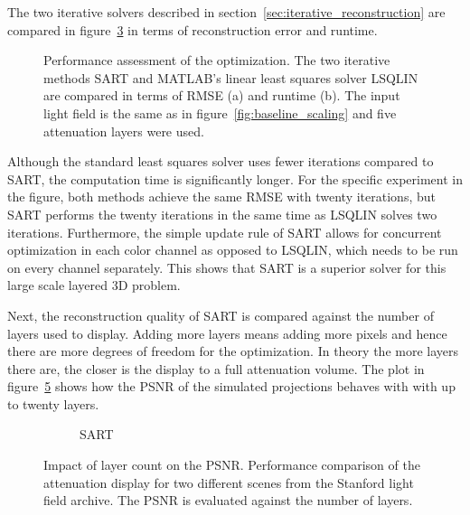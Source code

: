 The two iterative solvers described in section~\ref{sec:iterative_reconstruction} are compared in figure~\ref{fig:sart_vs_lsqlin} in terms of reconstruction error and runtime.
\begin{figure}[tb]
	\begin{subfigure}{0.5\textwidth}
		\centering
		
		\caption{}
		\label{fig:sart_lsqlin_iterations_vs_rmse}
	\end{subfigure}%
	\begin{subfigure}{0.5\textwidth}
		\centering
		
		\caption{}
		\label{fig:sart_lsqlin_iterations_vs_time}
	\end{subfigure}%
	\caption[Performance assessment of the optimization]
			{Performance assessment of the optimization.
			 The two iterative methods \mbox{SART} and \mbox{MATLAB's} linear least squares solver LSQLIN are compared in terms of \mbox{RMSE} (a) and runtime (b).
			 The input light field is the same as in figure~\ref{fig:baseline_scaling} and five attenuation layers were used.}
	\label{fig:sart_vs_lsqlin}
\end{figure}
Although the standard least squares solver uses fewer iterations compared to SART, the computation time is significantly longer.
For the specific experiment in the figure, both methods achieve the same RMSE with twenty iterations, but SART performs the twenty iterations in the same time as LSQLIN solves two iterations.
Furthermore, the simple update rule of SART allows for concurrent optimization in each color channel as opposed to LSQLIN, which needs to be run on every channel separately.
This shows that SART is a superior solver for this large scale layered 3D problem.

Next, the reconstruction quality of SART is compared against the number of layers used to display.
Adding more layers means adding more pixels and hence there are more degrees of freedom for the optimization.
In theory the more layers there are, the closer is the display to a full attenuation volume.
The plot in figure~\ref{fig:sart_layers_vs_psnr} shows how the PSNR of the simulated projections behaves with with up to twenty layers.
\begin{figure}[tb]
	\begin{subfigure}{\textwidth}
		\centering
		
		\caption{SART}
		\label{fig:sart_layers_vs_psnr}
	\end{subfigure}%
	\caption[Impact of layer count on \mbox{PSNR}]
			{Impact of layer count on the \mbox{PSNR}.
			 Performance comparison of the attenuation display for two different scenes from the Stanford light field archive.
			 The \mbox{PSNR} is evaluated against the number of layers.}
\end{figure}

